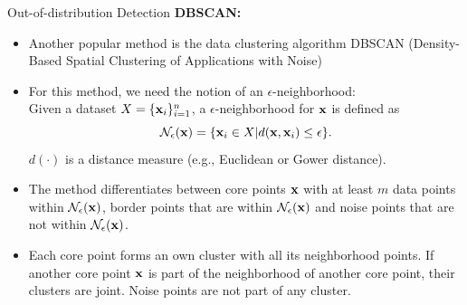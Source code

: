 \documentclass[11pt,compress,t,notes=noshow, xcolor=table]{beamer}
\begin{document}
\begin{frame}{Out-of-distribution Detection}
\textbf{DBSCAN:}
\begin{itemize}
	\item Another popular method is the data clustering algorithm DBSCAN (Density-Based Spatial Clustering of Applications with Noise) 
	\item For this method, we need the notion of an $\epsilon$-neighborhood: \\
	Given a dataset $X = \{\xv_i\}_{i = 1}^n$, a $\epsilon$-neighborhood for $\xv$ is defined as 
	$$ \mathcal{N}_{\epsilon}(\xv) = \{\xv_i \in X | d(\xv, \xv_i) \le \epsilon\}.$$
	 $d(\cdot)$ is a distance measure (e.g., Euclidean or Gower distance). 
	\item The method differentiates between core points $\xv$ with at least $m$ data points within $\mathcal{N}_{\epsilon}(\xv)$, border points that are within $\mathcal{N}_{\epsilon}(\xv)$ and noise points that are not within $\mathcal{N}_{\epsilon}(\xv)$.
	\item Each core point forms an own cluster with all its neighborhood points. If another core point $\xv$ is part of the neighborhood of another core point, their clusters are joint. Noise points are not part of any cluster. 
\end{itemize}
\vspace{-0.6cm}
\end{frame}
\end{document}
